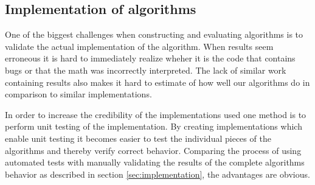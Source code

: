 \subsection{Implementation of algorithms}

One of the biggest challenges when constructing and evaluating algorithms is to
validate the actual implementation of the algorithm. When results seem 
erroneous it is hard to immediately realize wheher it is the code that contains bugs or that the 
math was incorrectly interpreted. The lack of similar work containing results
also makes it hard to estimate of how well our algorithms do in comparison 
to similar implementations.

In order to increase the credibility of the implementations used one method is
to perform unit testing of the implementation. By creating implementations
which enable unit testing it becomes easier to test the individual pieces of
the algorithms and thereby verify correct behavior. Comparing the process of
using automated tests with manually validating the results of the complete
algorithms behavior as described in section \ref{sec:implementation}, the
advantages are obvious.
